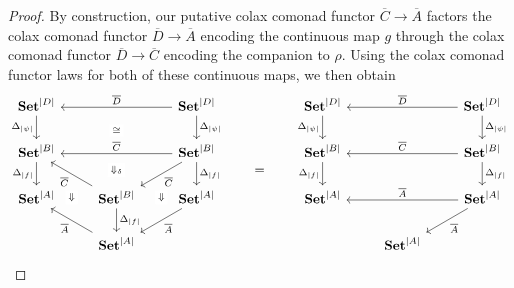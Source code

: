 \documentclass[11pt, oneside, article]{memoir}
\theoremstyle{plain}
\theoremstyle{definition}
\theoremstyle{remark}
\DeclarePairedDelimiter{\abs}{\lvert}{\rvert}
\newcommand{\namedcat}[1]{\mathbf{#1}}
\newcommand{\Set}{\namedcat{Set}}
\newcommand{\clift}[1]{\overline{#1}}
\newcommand{\pts}[1]{{\abs{#1}}}
\newcommand{\one}[1]{\pts{#1}}
\newcommand{\reindex}[1]{\Delta_{#1}}
\newcommand{\cmnd}[1]{{#1}}
\newcommand{\cA}{\cmnd{A}}
\newcommand{\cB}{\cmnd{B}}
\newcommand{\cC}{\cmnd{C}}
\newcommand{\cD}{\cmnd{D}}
\newcommand{\SetpA}{\Set^\pts{\cA}}
\newcommand{\SetpB}{\Set^\pts{\cB}}
\newcommand{\SetpD}{\Set^\pts{\cD}}
\begin{document}
\begin{proof}
  By construction, our putative colax comonad functor
  $\clift{\cC} \to \clift{\cA}$ factors the colax comonad functor
  $\clift{\cD} \to \clift{\cA}$ encoding the continuous map $g$
  through the colax comonad functor $\clift{\cD} \to \clift{\cC}$
  encoding the companion to $\rho$.  Using the colax comonad functor
  laws for both of these continuous maps, we then obtain
  \[
    \begin{tikzcd}
      \SetpD && \SetpD \\
      \SetpB && \SetpB \\
      \SetpA & \SetpB & \SetpA \\
      & \SetpA
      \arrow["{\reindex{\one{\psi}}}"', from=1-1, to=2-1]
      \arrow[""{name=0, anchor=center, inner sep=0}, "{\clift{\cD}}"', from=1-3, to=1-1]
      \arrow["{\reindex{\one{\psi}}}", from=1-3, to=2-3]
      \arrow["{\reindex{\one{f}}}"', from=2-1, to=3-1]
      \arrow[""{name=1, anchor=center, inner sep=0}, "{\clift{\cC}}"', from=2-3, to=2-1]
      \arrow[""{name=2, anchor=center, inner sep=0}, "{\clift{\cC}}", from=2-3, to=3-2]
      \arrow["{\reindex{\one{f}}}", from=2-3, to=3-3]
      \arrow[""{name=3, anchor=center, inner sep=0}, "{\clift{\cC}}", from=3-2, to=2-1]
      \arrow["{\reindex{\one{f}}}", from=3-2, to=4-2]
      \arrow[""{name=4, anchor=center, inner sep=0}, "{\clift{\cA}}", from=3-3, to=4-2]
      \arrow[""{name=5, anchor=center, inner sep=0}, "{\clift{\cA}}", from=4-2, to=3-1]
      \arrow["\cong"{description}, draw=none, from=0, to=1]
      \arrow["{\Downarrow_\delta}"{description}, draw=none, from=1, to=3-2]
      \arrow["\Downarrow"{description}, draw=none, from=2, to=4]
      \arrow["\Downarrow"{description}, draw=none, from=3, to=5]
    \end{tikzcd}
    \qquad=\qquad
    \begin{tikzcd}
      \SetpD && \SetpD \\
      \SetpB && \SetpB \\
      \SetpA && \SetpA \\
      & \SetpA
      \arrow["{\reindex{\one{\psi}}}"', from=1-1, to=2-1]
      \arrow[""{name=0, anchor=center, inner sep=0}, "{\clift{\cD}}"', from=1-3, to=1-1]
      \arrow["{\reindex{\one{\psi}}}", from=1-3, to=2-3]
      \arrow["{\reindex{\one{f}}}"', from=2-1, to=3-1]
      \arrow[""{name=1, anchor=center, inner sep=0}, "{\clift{\cC}}"', from=2-3, to=2-1]
      \arrow["{\reindex{\one{f}}}", from=2-3, to=3-3]
      \arrow[""{name=2, anchor=center, inner sep=0}, "{\clift{\cA}}"', from=3-3, to=3-1]
      \arrow["{\clift{\cA}}", from=3-3, to=4-2]

\end{tikzcd}\]
\end{proof}
\end{document}
